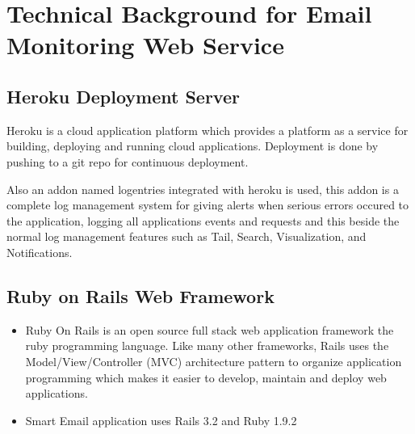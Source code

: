 
\chapter{Technical Background for Email Monitoring Web Service} %

\label{AppendixC} %



\section{Heroku Deployment Server}
Heroku is a cloud application platform which provides a platform as a service for 
building, deploying and running cloud applications. Deployment is done by pushing 
to a git repo for continuous deployment.

Also an addon named logentries integrated with heroku is used, this addon is a 
complete log management system for  giving alerts when serious errors occured to 
the application, logging all applications events and requests and this beside 
the normal log management features such as Tail, Search, Visualization, and Notifications.

\section{Ruby on Rails Web Framework}
\begin{itemize}
 \item Ruby On Rails is an open source full stack web application framework the ruby 
      programming language. Like many other frameworks, Rails uses the 
      Model/View/Controller (MVC) architecture pattern to organize application 
      programming which makes it easier to develop, maintain and deploy web applications.
  \item Smart Email application uses Rails 3.2 and Ruby 1.9.2
\end{itemize}

